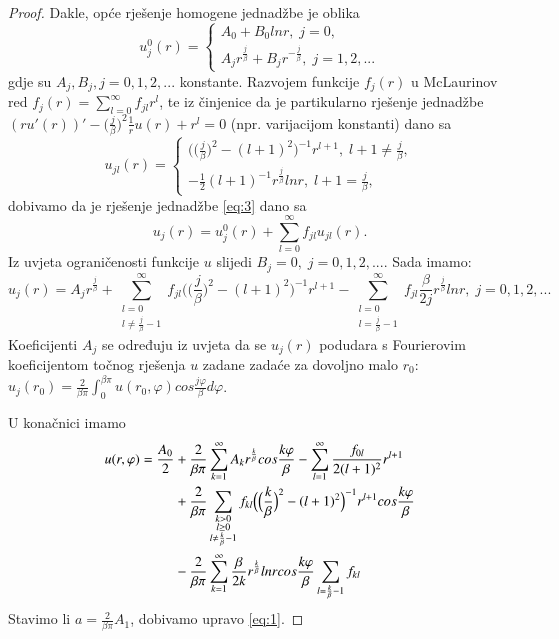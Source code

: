 \documentclass[a4paper,oneside,12pt]{memoir} %
\begin{document}
\begin{proof}
Dakle, opće rješenje homogene jednadžbe je oblika
  \[
    u_j^0(r) = \left\{
                \begin{array}{ll}
                  A_0 + B_0 lnr, \; j = 0, \\
                  A_j r^{\frac{j}{\beta}} + B_j r^{- \frac{j}{\beta}}, \; j = 1, 2, ...
                \end{array}
              \right.
  \]
gdje su $A_j, B_j, j = 0, 1, 2, ...$ konstante. \newline
Razvojem funkcije $f_j(r)$ u McLaurinov red $f_j(r) = \sum_{l=0}^\infty f_{jl} r^l$, te iz činjenice da je partikularno rješenje jednadžbe $(r u'(r))' - \Big( \frac{j}{\beta} \Big)^2 \frac{1}{r} u(r) + r^l = 0$ (npr. varijacijom konstanti) dano sa
  \[
    u_{jl}(r) = \left\{
                \begin{array}{ll}
                  \Big( \Big( \frac{j}{\beta} \Big)^2 - (l+1)^2 \Big)^{-1} r^{l+1}, \; l+1 \neq \frac{j}{\beta}, \\
                  - \frac{1}{2} (l+1)^{-1} r^{\frac{j}{\beta}} lnr, \; l+1 = \frac{j}{\beta},
                \end{array}
              \right.
  \]
dobivamo da je rješenje jednadžbe \ref{eq:3} dano sa
\begin{equation} \label{eq:4}
u_j(r) = u_j^0(r) + \sum_{l=0}^\infty f_{jl} u_{jl}(r).
\end{equation}
Iz uvjeta ograničenosti funkcije $u$ slijedi $B_j = 0, \; j = 0, 1, 2, ...$. Sada imamo:
\begin{equation} \label{eq:5}
u_j(r) = A_j r^{\frac{j}{\beta}} + \sum_{\substack{l=0 \\ l \neq \frac{j}{\beta} - 1}}^\infty f_{jl} \Big( \Big( \frac{j}{\beta} \Big)^2 - (l+1)^2 \Big)^{-1} r^{l+1} - \sum_{\substack{l=0 \\ l = \frac{j}{\beta} - 1}}^\infty f_{jl} \frac{\beta}{2j} r^{\frac{j}{\beta}} lnr, \; j = 0, 1, 2, ...
\end{equation}
Koeficijenti $A_j$ se određuju iz uvjeta da se $u_j(r)$ podudara s Fourierovim koeficijentom točnog rješenja $u$ zadane zadaće za dovoljno malo $r_0$: $u_j(r_0) = \frac{2}{\beta \pi} \int_0^{\beta \pi} u(r_0, \varphi) cos \frac{j \varphi}{\beta} d\varphi$.

U konačnici imamo
\begin{align}
u(r, \varphi) = \frac{A_0}{2} &+ \frac{2}{\beta \pi} \sum_{k=1}^\infty A_k r^{\frac{k}{\beta}} cos \frac{k \varphi}{\beta} - \sum_{l=1}^\infty \frac{f_{0l}}{2(l+1)^2} r^{l+1} \\ \notag
&+ \frac{2}{\beta \pi} \sum_{\substack{k > 0 \\ l \geq 0 \\ l \neq \frac{k}{\beta}-1}} f_{kl} \Big( \Big( \frac{k}{\beta} \Big)^2 - (l+1)^2 \Big)^{-1} r^{l+1} cos \frac{k \varphi}{\beta} \\ \notag
&- \frac{2}{\beta \pi} \sum_{k=1}^\infty \frac{\beta}{2k} r^{\frac{k}{\beta}} lnr cos \frac{k \varphi}{\beta} \sum_{l=\frac{k}{\beta}-1} f_{kl}
\end{align}
Stavimo li $a = \frac{2}{\beta \pi} A_1$, dobivamo upravo \ref{eq:1}.
\end{proof}
\end{document}
